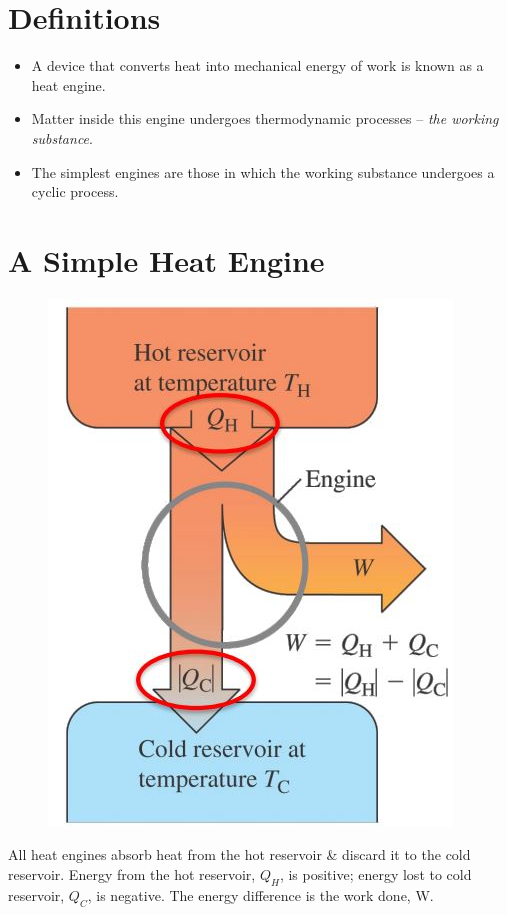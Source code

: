 \documentclass[a4paper, 11pt, normalem]{report}
\begin{document}
\section{Definitions}
\begin{itemize}
    \item A device that converts heat into mechanical energy of work is known as a heat engine.
    \item Matter inside this engine undergoes thermodynamic processes -- \emph{the working substance}.
    \item The simplest engines are those in which the working substance undergoes a cyclic process.
\end{itemize}

\section{A Simple Heat Engine}
\begin{figure}[H]
    \centering
    \includegraphics[scale=0.7]{HeatEngine.jpg}
\end{figure}
All heat engines absorb heat from the hot reservoir \& discard it to the cold reservoir.
Energy from the hot reservoir, $Q_{H}$, is positive; energy lost to cold reservoir, $Q_{C}$, is negative.
The energy difference is the work done, W.
\end{document}
